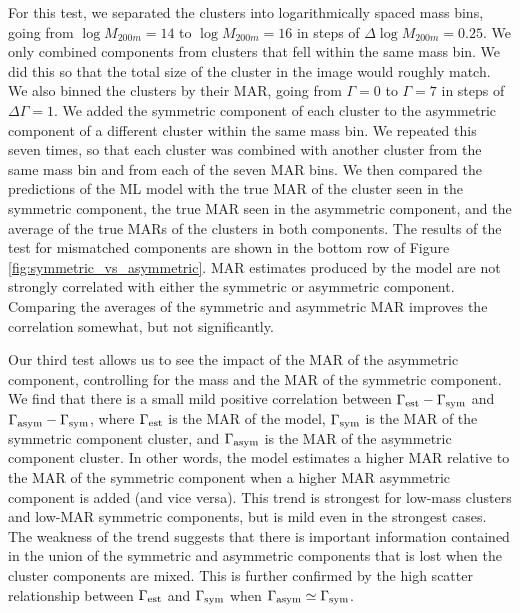 For this test, we separated the clusters into logarithmically spaced mass bins, going from $\log M_{200m} = 14$ to $\log M_{200m} = 16$ in steps of $\Delta\log M_{200m} = 0.25$. We only combined components from clusters that fell within the same mass bin. We did this so that the total size of the cluster in the image would roughly match. We also binned the clusters by their MAR, going from $\Gamma = 0$ to $\Gamma 
 = 7$ in steps of $\Delta \Gamma = 1$. We added the symmetric component of each cluster to the asymmetric component of a different cluster within the same mass bin. We repeated this seven times, so that each cluster was combined with another cluster from the same mass bin and from each of the seven MAR bins. We then compared the predictions of the ML model with the true MAR of the cluster seen in the symmetric component, the true MAR seen in the asymmetric component, and the average of the true MARs of the clusters in both components. The results of the test for mismatched components are shown in the bottom row of Figure \ref{fig:symmetric_vs_asymmetric}. MAR estimates produced by the model are not strongly correlated with either the symmetric or asymmetric component. Comparing the averages of the symmetric and asymmetric MAR improves the correlation somewhat, but not significantly.

 Our third test allows us to see the impact of the MAR of the asymmetric component, controlling for the mass and the MAR of the symmetric component. We find that there is a small mild positive correlation between $\Gamma_{\rm est} - \Gamma_{\rm sym}$ and $\Gamma_{\rm asym} - \Gamma_{\rm sym}$, where $\Gamma_{\rm est}$ is the MAR of the model, $\Gamma_{\rm sym}$ is the MAR of the symmetric component cluster, and $\Gamma_{\rm asym}$ is the MAR of the asymmetric component cluster. In other words, the model estimates a higher MAR relative to the MAR of the symmetric component when a higher MAR asymmetric component is added (and vice versa). This trend is strongest for low-mass clusters and low-MAR symmetric components, but is mild even in the strongest cases. The weakness of the trend suggests that there is important information contained in the union of the symmetric and asymmetric components that is lost when the cluster components are mixed. This is further confirmed by the high scatter relationship between $\Gamma_{\rm est}$ and $\Gamma_{\rm sym}$ when $\Gamma_{\rm asym} \simeq \Gamma_{\rm sym}$.

